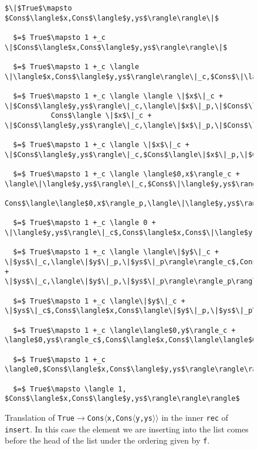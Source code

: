 \documentclass[12pt,letterpaper]{article}
\newcommand{\T}[1]{\texttt{#1}}
\begin{document}
\begin{figure}[H]
\caption{Translation of \T{True$\to$Cons$\langle$x,Cons$\langle$y,ys$\rangle\rangle$} in the inner \T{rec} of \T{insert}.
In this case the element we are inserting into the list comes before the head of the list under the ordering given by \T{f}.
}
\label{fig:insert_true}
\begin{lstlisting}
$\|$True$\mapsto $Cons$\langle$x,Cons$\langle$y,ys$\rangle\rangle\|$

  $=$ True$\mapsto 1 +_c \|$Cons$\langle$x,Cons$\langle$y,ys$\rangle\rangle\|$

  $=$ True$\mapsto 1 +_c \langle \|\langle$x,Cons$\langle$y,ys$\rangle\rangle\|_c,$Cons$\|\langle$x,Cons$\langle$y,ys$\rangle\rangle\|_p\rangle$

  $=$ True$\mapsto 1 +_c \langle \langle \|$x$\|_c + \|$Cons$\langle$y,ys$\rangle\|_c,\langle\|$x$\|_p,\|$Cons$\langle$y,ys$\rangle\|_p\rangle\rangle_c$,
           Cons$\langle \|$x$\|_c + \|$Cons$\langle$y,ys$\rangle\|_c,\langle\|$x$\|_p,\|$Cons$\langle$y,ys$\rangle\|_p\rangle\rangle_p\rangle$

  $=$ True$\mapsto 1 +_c \langle \|$x$\|_c + \|$Cons$\langle$y,ys$\rangle\|_c,$Cons$\langle\|$x$\|_p,\|$Cons$\langle$y,ys$\rangle\|_p\rangle\rangle$

  $=$ True$\mapsto 1 +_c \langle \langle$0,x$\rangle_c + \langle\|\langle$y,ys$\rangle\|_c,$Cons$\|\langle$y,ys$\rangle\|_p\rangle_c$,
          Cons$\langle\langle$0,x$\rangle_p,\langle\|\langle$y,ys$\rangle\|_c,$Cons$\|\langle$y,ys$\rangle\|_p\rangle_p\rangle\rangle$

  $=$ True$\mapsto 1 +_c \langle 0 + \|\langle$y,ys$\rangle\|_c$,Cons$\langle$x,Cons$\|\langle$y,ys$\rangle\|_p\rangle\rangle$

  $=$ True$\mapsto 1 +_c \langle \langle\|$y$\|_c + \|$ys$\|_c,\langle\|$y$\|_p,\|$ys$\|_p\rangle\rangle_c$,Cons$\langle$x,Cons$\langle\|$y$\|_c + \|$ys$\|_c,\langle\|$y$\|_p,\|$ys$\|_p\rangle\rangle_p\rangle\rangle$

  $=$ True$\mapsto 1 +_c \langle\|$y$\|_c + \|$ys$\|_c$,Cons$\langle$x,Cons$\langle\|$y$\|_p,\|$ys$\|_p\rangle\rangle\rangle$

  $=$ True$\mapsto 1 +_c \langle\langle$0,y$\rangle_c + \langle$0,ys$\rangle_c$,Cons$\langle$x,Cons$\langle\langle$0,y$\rangle_p,\langle$0,ys$\rangle_p\rangle\rangle\rangle$

  $=$ True$\mapsto 1 +_c \langle0,$Cons$\langle$x,Cons$\langle$y,ys$\rangle\rangle\rangle$

  $=$ True$\mapsto \langle 1, $Cons$\langle$x,Cons$\langle$y,ys$\rangle\rangle\rangle$
\end{lstlisting}
\end{figure}
\end{document}

